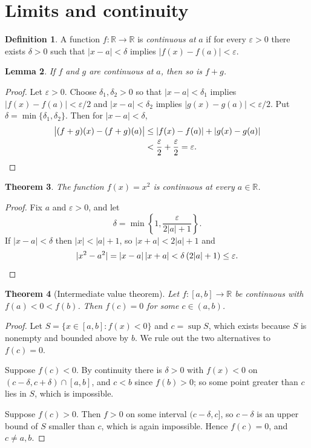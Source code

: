 \documentclass[12pt]{article}
\newtheorem{theorem}{Theorem}
\newtheorem{lemma}[theorem]{Lemma}
\theoremstyle{definition}
\newtheorem{definition}[theorem]{Definition}
\newcommand{\R}{\mathbb{R}}
\newcommand{\eps}{\varepsilon}
\begin{document}
\section{Limits and continuity}

\begin{definition}
A function $f \colon \R \to \R$ is \emph{continuous at} $a$ if for every
$\eps > 0$ there exists $\delta > 0$ such that $|x - a| < \delta$ implies
$|f(x) - f(a)| < \eps$.
\end{definition}

\begin{lemma}\label{lem:sum}
If $f$ and $g$ are continuous at $a$, then so is $f + g$.
\end{lemma}

\begin{proof}
Let $\eps > 0$. Choose $\delta_1, \delta_2 > 0$ so that $|x - a| <
\delta_1$ implies $|f(x) - f(a)| < \eps/2$ and $|x - a| < \delta_2$ implies
$|g(x) - g(a)| < \eps/2$. Put $\delta = \min\{\delta_1, \delta_2\}$. Then
for $|x - a| < \delta$,
\begin{align*}
  \bigl|(f+g)(x) - (f+g)(a)\bigr|
    &\le |f(x) - f(a)| + |g(x) - g(a)| \\
    &< \frac{\eps}{2} + \frac{\eps}{2} = \eps. \qedhere
\end{align*}
\end{proof}

\begin{theorem}\label{thm:square}
The function $f(x) = x^2$ is continuous at every $a \in \R$.
\end{theorem}

\begin{proof}
Fix $a$ and $\eps > 0$, and let
\[
  \delta = \min\left\{ 1, \frac{\eps}{2|a| + 1} \right\}.
\]
If $|x - a| < \delta$ then $|x| < |a| + 1$, so $|x + a| < 2|a| + 1$ and
\[
  |x^2 - a^2| = |x - a|\,|x + a| < \delta\,(2|a| + 1) \le \eps. \qedhere
\]
\end{proof}

\begin{theorem}[Intermediate value theorem]
Let $f \colon [a,b] \to \R$ be continuous with $f(a) < 0 < f(b)$. Then
$f(c) = 0$ for some $c \in (a,b)$.
\end{theorem}

\begin{proof}
Let $S = \{ x \in [a,b] : f(x) < 0 \}$ and $c = \sup S$, which exists
because $S$ is nonempty and bounded above by $b$. We rule out the two
alternatives to $f(c) = 0$.

Suppose $f(c) < 0$. By continuity there is $\delta > 0$ with $f(x) < 0$ on
$(c - \delta, c + \delta) \cap [a,b]$, and $c < b$ since $f(b) > 0$; so some
point greater than $c$ lies in $S$, which is impossible.

Suppose $f(c) > 0$. Then $f > 0$ on some interval $(c - \delta, c]$, so
$c - \delta$ is an upper bound of $S$ smaller than $c$, which is again
impossible. Hence $f(c) = 0$, and $c \ne a, b$.
\end{proof}
\end{document}
